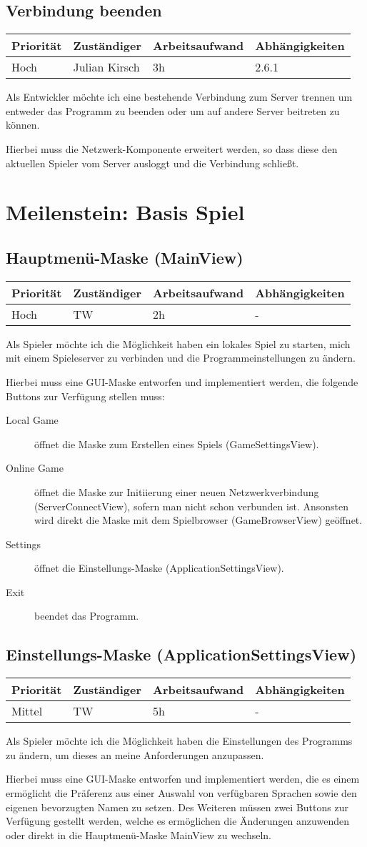 \documentclass[a4paper]{scrreprt}
\newenvironment{requirement}[5] {
	\subsection{#1}
	\begin{tabularx}{\textwidth}{|X|l|X|X|}
		\hline
		Priorität & Zuständiger & Arbeitsaufwand & Abhängigkeiten \\
		\hline
		#2 & #3 & #4 & #5 \\
		\hline
	\end{tabularx}
	}{
	\newpage
	}
\begin{document}
\begin{requirement}{Verbindung beenden}{Hoch}{Julian Kirsch}{3h}{2.6.1}

\begin{center}
	Als Entwickler möchte ich eine bestehende Verbindung zum Server trennen um entweder das Programm zu beenden oder um auf andere Server beitreten zu können.
\end{center}

Hierbei muss die Netzwerk-Komponente erweitert werden, so dass diese den aktuellen Spieler vom Server ausloggt und die Verbindung schließt.

\end{requirement}


\section{Meilenstein: Basis Spiel}


\begin{requirement}{Hauptmenü-Maske (MainView)}{Hoch}{TW}{2h}{-}

\begin{center}
	Als Spieler möchte ich die Möglichkeit haben ein lokales Spiel zu starten, mich mit einem Spieleserver zu verbinden und die Programmeinstellungen zu ändern.
\end{center}


Hierbei muss eine GUI-Maske entworfen und implementiert werden, die folgende Buttons zur Verfügung stellen muss:
\begin{description}
	\item[Local Game] öffnet die Maske zum Erstellen eines Spiels (\glqq GameSettingsView\grqq{}).
	\item[Online Game] öffnet die Maske zur Initiierung einer neuen Netzwerkverbindung (\glqq ServerConnectView\grqq{}), sofern man nicht schon verbunden ist.
				Ansonsten wird direkt die Maske mit dem Spielbrowser (\glqq GameBrowserView\grqq{}) geöffnet.
	\item[Settings] öffnet die Einstellungs-Maske (\glqq ApplicationSettingsView\grqq{}).
	\item[Exit] beendet das Programm.
\end{description}

\end{requirement}


\begin{requirement}{Einstellungs-Maske (ApplicationSettingsView)}{Mittel}{TW}{5h}{-}

\begin{center}
	Als Spieler möchte ich die Möglichkeit haben die Einstellungen des Programms zu ändern, um dieses an meine Anforderungen anzupassen.
\end{center}

Hierbei muss eine GUI-Maske entworfen und implementiert werden, die es einem ermöglicht die Präferenz aus einer Auswahl von verfügbaren Sprachen sowie den eigenen bevorzugten Namen zu setzen. Des Weiteren müssen zwei Buttons zur Verfügung gestellt werden, welche es ermöglichen die Änderungen anzuwenden oder direkt in die Hauptmenü-Maske \glqq MainView\grqq{} zu wechseln.

\end{requirement}
\end{document}
